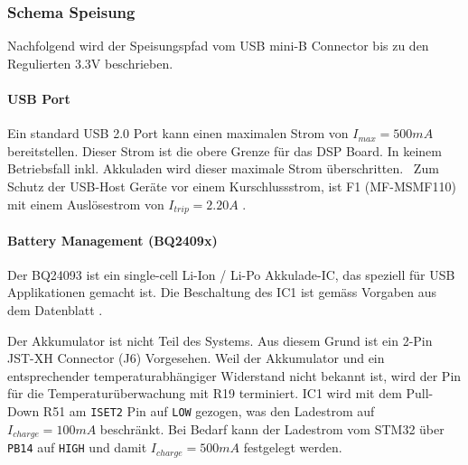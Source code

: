 \subsubsection{Schema Speisung}
\label{sec:Schema_Speisung}

Nachfolgend wird der Speisungspfad vom USB mini-B Connector bis zu den Regulierten 3.3\si{V} beschrieben.

\paragraph{USB Port}

Ein standard USB 2.0 Port kann einen maximalen Strom von ${I_{max}=500\si{mA}}$ bereitstellen.
Dieser Strom ist die obere Grenze für das DSP Board. In keinem Betriebsfall inkl. Akkuladen wird dieser maximale Strom überschritten.
\
Zum Schutz der USB-Host Geräte vor einem Kurschlussstrom, ist F1 (MF-MSMF110) mit einem Auslösestrom von ${I_{trip}=2.20\si{A}}$ \cite{usb-fuse}.


\paragraph{Battery Management (BQ2409x)}

Der BQ24093 ist ein single-cell Li-Ion / Li-Po Akkulade-IC, das speziell für USB Applikationen gemacht ist.
Die Beschaltung des IC1 ist gemäss Vorgaben aus dem Datenblatt \cite{bq2409x}.

Der Akkumulator ist nicht Teil des Systems. Aus diesem Grund ist ein 2-Pin JST-XH Connector (J6) Vorgesehen.
Weil der Akkumulator und ein entsprechender temperaturabhängiger Widerstand nicht bekannt ist, 
wird der Pin für die Temperaturüberwachung mit R19 terminiert.
IC1 wird mit dem Pull-Down R51 am \texttt{ISET2} Pin auf \texttt{LOW} gezogen, was den Ladestrom auf ${I_{charge}=100\si{mA}}$ beschränkt. 
Bei Bedarf kann der Ladestrom vom STM32 über \texttt{PB14} auf \texttt{HIGH} und damit ${I_{charge}=500\si{mA}}$ festgelegt werden.


